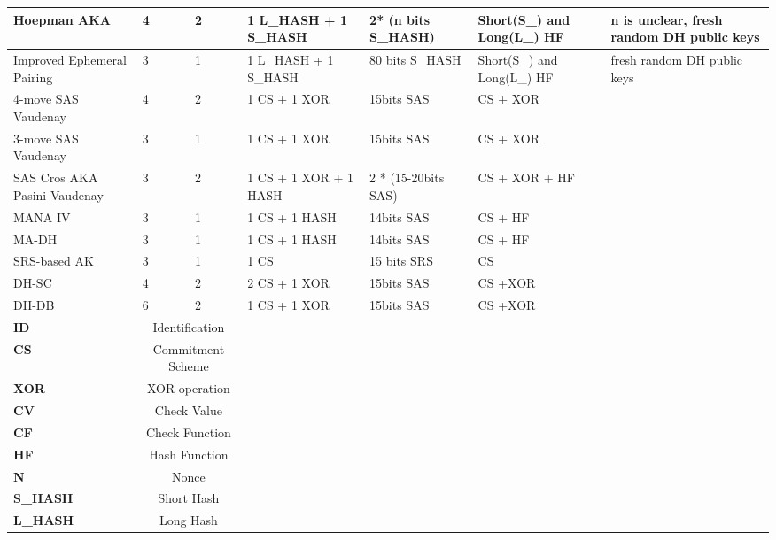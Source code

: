 \begin{table}[ht]
{\begin{tabular}{ | p{2cm} | p{1.4cm} | p{1.4cm} | p{2cm} | p{2.2cm} | p{2cm} | p{2cm}| }
Hoepman AKA & 4	& 2 &	 1 L\_HASH + 1 S\_HASH & 	2* (n bits S\_HASH) &	 Short(S\_) and Long(L\_) HF & n is unclear, fresh random DH public keys \\ \hline 

Improved	Ephemeral Pairing & 3 &	 1 &	 1 L\_HASH + 1 S\_HASH &	80 bits S\_HASH & Short(S\_) and Long(L\_) HF & fresh random DH public keys \\ \hline 
 
4-move SAS Vaudenay & 4	& 2 & 1 CS + 1 XOR & 15bits SAS	& CS + XOR & \\ \hline 

3-move SAS Vaudenay & 3	& 1 & 1 CS + 1 XOR & 15bits SAS	& CS + XOR & \\ \hline 
 																				
SAS Cros AKA Pasini-Vaudenay &	3 &	2 &	1 CS + 1 XOR + 1 HASH & 2 * (15-20bits SAS) & CS + XOR + HF & \\ \hline 

MANA IV & 3 & 1 & 1 CS + 1 HASH & 14bits SAS & CS + HF & \\ \hline 

MA-DH & 3 &	1 &	1 CS + 1 HASH & 14bits SAS & CS + HF & \\ \hline 

 SRS-based AK & 3 & 1 &	1 CS &	 15 bits SRS &	 CS & \\ \hline 

DH-SC & 4 &	2 &	2 CS + 1 XOR & 15bits SAS & CS +XOR & \\ \hline 

DH-DB & 6 &	2 &	1 CS + 1 XOR & 15bits SAS & CS +XOR & \\ \hline \hline 

\textbf{ID} &\multicolumn{2}{c}{Identification} & & & & \\
\textbf{CS} &\multicolumn{2}{c}{Commitment Scheme} & & & & \\
\textbf{XOR} &\multicolumn{2}{c}{XOR operation} & & & & \\
\textbf{CV} &\multicolumn{2}{c}{Check Value} & & & & \\
\textbf{CF} &\multicolumn{2}{c}{Check Function} & & & & \\
\textbf{HF} &\multicolumn{2}{c}{Hash Function} & & & & \\
\textbf{N} &\multicolumn{2}{c}{Nonce} & & & & \\
\textbf{S\_HASH} &\multicolumn{2}{c}{Short Hash} & & & & \\
\textbf{L\_HASH} &\multicolumn{2}{c}{Long Hash} & & & & \\ \hline
\end{tabular}
}
\end{table}


